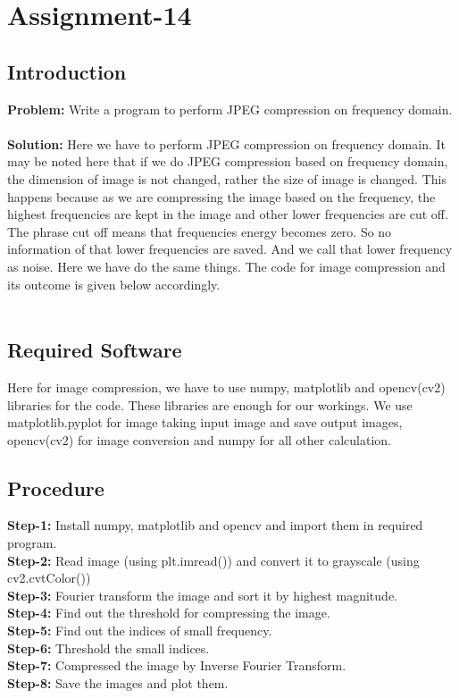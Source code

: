 \documentclass{article}
\begin{document}
{
    \section{Assignment-14}
    \subsection{Introduction}
    \textbf {Problem: }
    Write a program to perform JPEG compression on frequency domain.\\
    \\
    \textbf{Solution: }
    Here we have to perform JPEG compression on frequency domain. It may be noted here that if we do JPEG compression based on frequency domain, the dimension of image is not changed, rather the size of image is changed. This happens because as we are compressing the image based on the frequency, the highest frequencies are kept in the image and other lower frequencies are cut off. The phrase cut off means that frequencies energy becomes zero. So no information of that lower frequencies are saved. And we call that lower frequency as noise. Here we have do the same things. The code for image compression and its outcome is given below accordingly.\\
    \\
    \subsection{Required Software}
    Here for image compression, we have to use numpy, matplotlib and opencv(cv2) libraries for the code. These libraries are enough for our workings. We use matplotlib.pyplot for image taking input image and save output images, opencv(cv2) for image conversion and numpy for all other calculation.\\
    
    \subsection{Procedure}
    \textbf{Step-1:}
    Install numpy, matplotlib and opencv and import them in required program.\\
    \textbf{Step-2:}
    Read image (using plt.imread()) and convert it to grayscale (using cv2.cvtColor()) \\
    \textbf{Step-3:}
    Fourier transform the image and sort it by highest magnitude. \\
    \textbf{Step-4:}
    Find out the threshold for compressing the image. \\
    \textbf{Step-5:}
    Find out the indices of small frequency. \\
    \textbf{Step-6:}
    Threshold the small indices. \\
    \textbf{Step-7:}
    Compressed the image by Inverse Fourier Transform. \\
    \textbf{Step-8:}
    Save the images and plot them. \\
    
}
\end{document}
